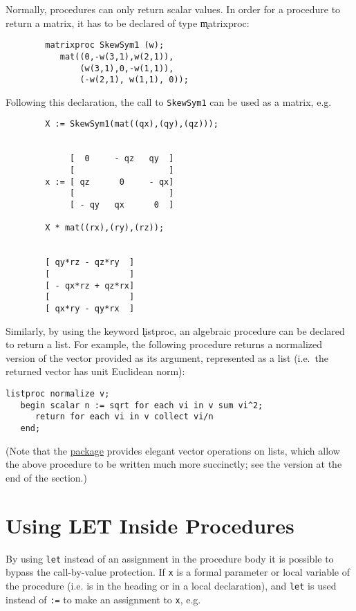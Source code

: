 Normally, procedures can only return scalar values. In order for a procedure to
return a matrix, it has to be declared of
type \k{matrixproc}:
\begin{verbatim}
        matrixproc SkewSym1 (w);
           mat((0,-w(3,1),w(2,1)),
               (w(3,1),0,-w(1,1)),
               (-w(2,1), w(1,1), 0));
\end{verbatim}
Following this declaration, the call to \texttt{SkewSym1} can be used as a matrix, e.g.
\begin{verbatim}
        X := SkewSym1(mat((qx),(qy),(qz)));


             [  0     - qz   qy  ]
             [                   ]
        x := [ qz      0     - qx]
             [                   ]
             [ - qy   qx      0  ]

        X * mat((rx),(ry),(rz));


        [ qy*rz - qz*ry  ]
        [                ]
        [ - qx*rz + qz*rx]
        [                ]
        [ qx*ry - qy*rx  ]
\end{verbatim}
\hypertarget{reserved:LISTPROC}{}
Similarly, by using the keyword \k{listproc},
an algebraic procedure can be declared to return a
list. For example, the following
procedure returns a normalized version of the vector provided as its
argument, represented as a list (i.e.\ the returned vector has unit
Euclidean norm):
\begin{verbatim}
listproc normalize v;
   begin scalar n := sqrt for each vi in v sum vi^2;
      return for each vi in v collect vi/n
   end;
\end{verbatim}
(Note that the \hyperref[LISTVECOPS]{ package}
provides elegant vector operations on lists, which allow the above
procedure to be written much more succinctly; see the version at the
end of the  section.)


\section{Using LET Inside Procedures}

By using \texttt{let} instead of an assignment in the procedure
body it is possible to bypass the call-by-value
 protection.  If \texttt{x} is a formal parameter or local
variable of the procedure (i.e. is in the heading or in a local
declaration), and \texttt{let} is used instead of \texttt{:=} to make an
assignment to \texttt{x}, e.g.

